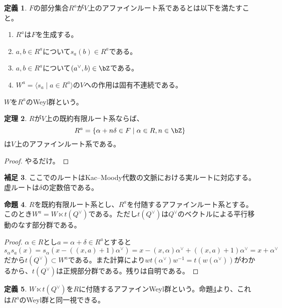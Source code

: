 \documentclass[uplatex, a4paper, dvipdfmx]{jsarticle}
\theoremstyle{definition}
\newtheorem{theorem}{定理}[section]
\newtheorem{definition}[theorem]{定義}
\newtheorem{proposition}[theorem]{命題}
\newtheorem{remark}[theorem]{補足}
\begin{document}
\begin{definition}
    $F$の部分集合$R^a$が$V$上のアファインルート系であるとは以下を満たすこと。
    \begin{enumerate}
        \item $R^a$は$F$を生成する。
        \item $a, b \in R^a$について$s_a(b) \in R^a$である。
        \item $a, b \in R^a$について$(a^\vee, b) \in \bZ$である。
        \item $W^a = \langle s_a \mid a \in R^a \rangle$の$V$への作用は固有不連続である。
    \end{enumerate}
    $W$を$R^a$のWeyl群という。
\end{definition}

\begin{theorem}
    $R$が$V$上の既約有限ルート系ならば、
    \begin{equation}
        R^a = \{\alpha + n \delta \in F \mid \alpha \in R, n \in \bZ\}
    \end{equation}
    は$V$上のアファインルート系である。
\end{theorem}
\begin{proof}
    やるだけ。
\end{proof}
\begin{remark}
    ここでのルートはKac--Moody代数の文脈における実ルートに対応する。虚ルートは$\delta$の定数倍である。
\end{remark}
\begin{proposition}\label{prop:structure-of-affine-weyl-group}
    $R$を既約有限ルート系とし、$R^a$を付随するアファインルート系とする。このとき$W^a = W \ltimes t(Q^\vee)$である。ただし$t(Q^\vee)$は$Q^\vee$のベクトルによる平行移動のなす部分群である。
\end{proposition}
\begin{proof}
    $\alpha \in R$とし$a = \alpha + \delta \in R^a$とすると
    \begin{equation}
        s_\alpha s_a(x) = s_\alpha(x - ((x, a) + 1) \alpha^\vee) = x - (x, \alpha)\alpha^\vee + ((x, a) + 1) \alpha^\vee = x + \alpha^\vee
    \end{equation}
    だから$t(Q^\vee) \subset W^a$である。また計算により$wt(\alpha^\vee)w^{-1} = t(w(\alpha^\vee))$がわかるから、$t(Q^\vee)$は正規部分群である。残りは自明である。
\end{proof}
\begin{definition}
    $W \ltimes t(Q^\vee)$を$R$に付随するアファインWeyl群という。命題\ref{prop:structure-of-affine-weyl-group}より、これは$R^a$のWeyl群と同一視できる。
\end{definition}
\end{document}
